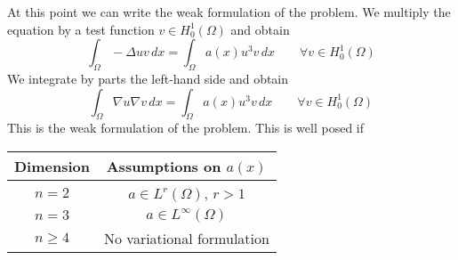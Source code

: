     At this point we can write the weak formulation of the problem. We multiply the equation by a test function \(v \in H^1_0(\Omega)\) and obtain 
    \[
        \int_\Omega - \Delta u v \, dx = \int_\Omega a(x) u^3 v \, dx \qquad \forall v \in H^1_0(\Omega)
    \]
    We integrate by parts the left-hand side and obtain
    \[
        \int_\Omega \nabla u \nabla v \, dx = \int_\Omega a(x) u^3 v \, dx \qquad \forall v \in H^1_0(\Omega)
    \]
    This is the weak formulation of the problem. This is well posed if 
    \begin{table}[h]
        \centering
        \begin{tabular}{|c|c|}
            \hline
            Dimension & Assumptions on $a(x)$ \\
            \hline
            $n = 2$ & $a \in L^r(\Omega)$, $r > 1$ \\
            $n = 3$ & $a \in L^\infty(\Omega)$ \\
            $n \geq 4$ & No variational formulation \\
            \hline
        \end{tabular}
    \end{table}
    
